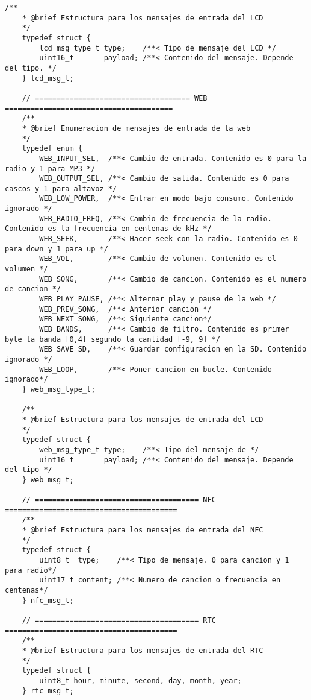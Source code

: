 \begin{lstlisting}[captionpos=t, caption={Fichero \texttt{controlThread.h} con las estructuras de mensajes}]
    /**
    * @brief Estructura para los mensajes de entrada del LCD
    */
    typedef struct {
        lcd_msg_type_t type;    /**< Tipo de mensaje del LCD */
        uint16_t       payload; /**< Contenido del mensaje. Depende del tipo. */
    } lcd_msg_t;

    // ==================================== WEB =======================================
    /**
    * @brief Enumeracion de mensajes de entrada de la web
    */
    typedef enum {
        WEB_INPUT_SEL,  /**< Cambio de entrada. Contenido es 0 para la radio y 1 para MP3 */
        WEB_OUTPUT_SEL, /**< Cambio de salida. Contenido es 0 para cascos y 1 para altavoz */
        WEB_LOW_POWER,  /**< Entrar en modo bajo consumo. Contenido ignorado */
        WEB_RADIO_FREQ, /**< Cambio de frecuencia de la radio. Contenido es la frecuencia en centenas de kHz */
        WEB_SEEK,       /**< Hacer seek con la radio. Contenido es 0 para down y 1 para up */
        WEB_VOL,        /**< Cambio de volumen. Contenido es el volumen */
        WEB_SONG,       /**< Cambio de cancion. Contenido es el numero de cancion */
        WEB_PLAY_PAUSE, /**< Alternar play y pause de la web */
        WEB_PREV_SONG,  /**< Anterior cancion */
        WEB_NEXT_SONG,  /**< Siguiente cancion*/
        WEB_BANDS,      /**< Cambio de filtro. Contenido es primer byte la banda [0,4] segundo la cantidad [-9, 9] */
        WEB_SAVE_SD,    /**< Guardar configuracion en la SD. Contenido ignorado */
        WEB_LOOP,       /**< Poner cancion en bucle. Contenido ignorado*/
    } web_msg_type_t;

    /**
    * @brief Estructura para los mensajes de entrada del LCD
    */
    typedef struct {
        web_msg_type_t type;    /**< Tipo del mensaje de */
        uint16_t       payload; /**< Contenido del mensaje. Depende del tipo */
    } web_msg_t;

    // ====================================== NFC ========================================
    /**
    * @brief Estructura para los mensajes de entrada del NFC
    */
    typedef struct {
        uint8_t  type;    /**< Tipo de mensaje. 0 para cancion y 1 para radio*/
        uint17_t content; /**< Numero de cancion o frecuencia en centenas*/
    } nfc_msg_t;

    // ====================================== RTC ========================================
    /**
    * @brief Estructura para los mensajes de entrada del RTC
    */
    typedef struct {
        uint8_t hour, minute, second, day, month, year;
    } rtc_msg_t;


\end{lstlisting}
